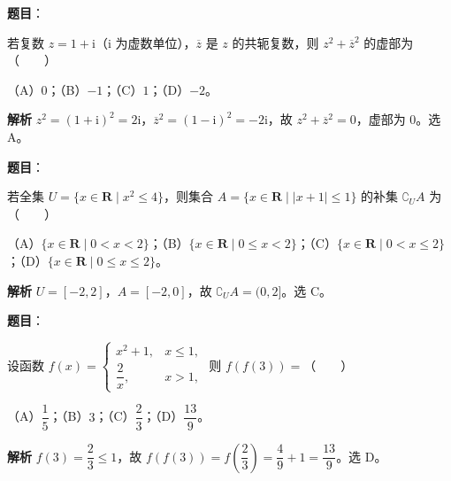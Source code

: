 
\begin{answer}

\textbf{题目}：

若复数 $z=1+\mathrm i$（$\mathrm i$ 为虚数单位），$\overline z$ 是 $z$ 的共轭复数，则 $z^2+\overline z^2$ 的虚部为\mbox{（　　）}

（A）$0$；（B）$-1$；（C）$1$；（D）$-2$。

\textbf{解析}
$z^2=(1+\mathrm i)^2=2\mathrm i$，$\overline z^2=(1-\mathrm i)^2=-2\mathrm i$，故 $z^2+\overline z^2=0$，虚部为 $0$。选 A。


\end{answer}
\begin{answer}

\textbf{题目}：

若全集 $U=\{x\in\mathbf R\mid x^2\leqslant4\}$，则集合 $A=\{x\in\mathbf R\mid|x+1|\leqslant1\}$ 的补集 $\complement_UA$ 为\mbox{（　　）}

（A）$\{x\in\mathbf R\mid0<x<2\}$；（B）$\{x\in\mathbf R\mid0\leqslant x<2\}$；（C）$\{x\in\mathbf R\mid0<x\leqslant2\}$；（D）$\{x\in\mathbf R\mid0\leqslant x\leqslant2\}$。

\textbf{解析}
$U=[-2,2]$，$A=[-2,0]$，故 $\complement_UA=(0,2]$。选 C。


\end{answer}
\begin{answer}

\textbf{题目}：

设函数 $f(x)=\begin{cases}x^2+1,&x\leqslant1,\\\dfrac2x,&x>1,\end{cases}$ 则 $f(f(3))=$\mbox{（　　）}

（A）$\dfrac15$；（B）$3$；（C）$\dfrac23$；（D）$\dfrac{13}9$。

\textbf{解析}
$f(3)=\dfrac23\leqslant1$，故 $f(f(3))=f\left(\dfrac23\right)=\dfrac49+1=\dfrac{13}9$。选 D。


\end{answer}
